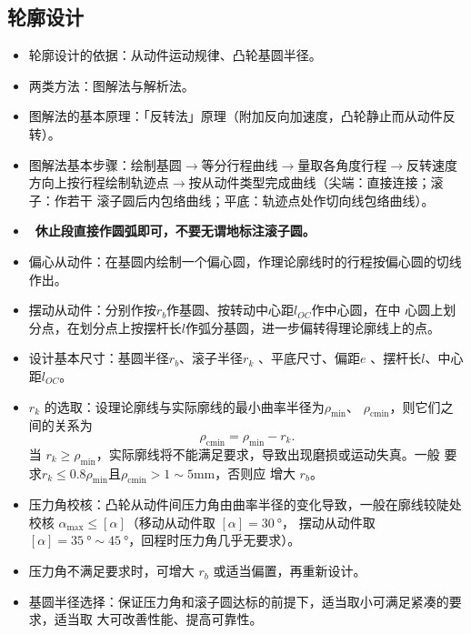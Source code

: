 \documentclass[12pt,a4paper]{article}
\newcommand{\tightlist}{\setlength{\parskip}{0pt}\setlength{\itemsep}{0pt}}
\newcommand{\hint}[1]{\textsf{（#1）}}
\newcommand{\minor}[1]{{\color{gray} #1}}
\newcommand{\then}{$\to$}
\renewcommand{\emph}[1]{\faIcon[regular]{lightbulb}\ \textbf{#1}}
\begin{document}
\subsection{轮廓设计}
\begin{itemize}\tightlist
    \item 轮廓设计的依据：从动件运动规律、凸轮基圆半径。
    \item \minor{两类方法：图解法与解析法。}
    \item 图解法的基本原理：「反转法」原理\hint{附加反向加速度，凸轮静止而从动件反转}。
    \item 图解法基本步骤：绘制基圆\then 等分行程曲线\then 量取各角度行程\then 反转速度
    方向上按行程绘制轨迹点\then 按从动件类型完成曲线\hint{尖端：直接连接；滚子：作若干
    滚子圆后内包络曲线；平底：轨迹点处作切向线包络曲线}。
    \item \emph{休止段直接作圆弧即可，不要无谓地标注滚子圆。}
    \item 偏心从动件：在基圆内绘制一个偏心圆，作理论廓线时的行程按偏心圆的切线作出。
    \item \minor{摆动从动件：分别作按$r_b$作基圆、按转动中心距$l_{OC}$作中心圆，在中
    心圆上划分点，在划分点上按摆杆长$l$作弧分基圆，进一步偏转得理论廓线上的点。}
    \item 设计基本尺寸：基圆半径$r_b$、滚子半径$r_k$\minor{、平底尺寸}、偏距$e$\minor{
    、摆杆长$l$、中心距$l_{OC}$}。
    \item $r_k$ 的选取：设理论廓线与实际廓线的最小曲率半径为$\rho_\text{min}$、
    $\rho_\text{cmin}$，则它们之间的关系为
    \[ \rho_\text{cmin}=\rho_\text{min}-r_k. \]
    当 $r_k\geq\rho_\text{min}$，实际廓线将不能满足要求，导致出现磨损或运动失真。一般
    要求$r_k\leq0.8\rho_\text{min}$且$\rho_\text{cmin}>1\sim5\text{mm}$，否则应
    增大 $r_b$。
    \item 压力角校核：凸轮从动件间压力角由曲率半径的变化导致，一般在廓线较陡处校核
    $\alpha_\text{max}\leq[\alpha]$\hint{移动从动件取 $[\alpha]=\SI{30}\degree$，
    摆动从动件取 $[\alpha]=\SI{35}\degree\sim\SI{45}\degree$，回程时压力角几乎无要求}。
    \item 压力角不满足要求时，可增大 $r_b$ 或适当偏置，再重新设计。
    \item 基圆半径选择：保证压力角和滚子圆达标的前提下，适当取小可满足紧凑的要求，适当取
    大可改善性能、提高可靠性。
\end{itemize}
\end{document}
